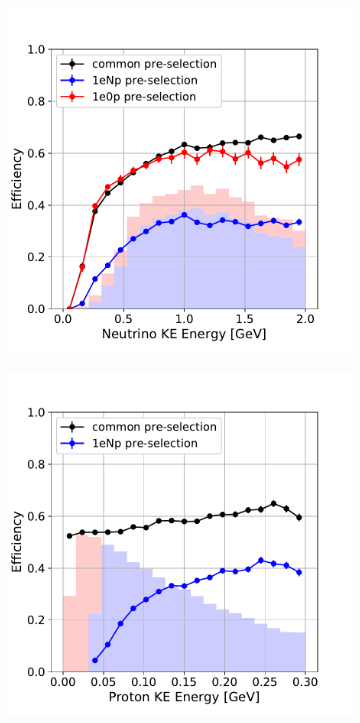 \documentclass[a4paper]{article}
\begin{document}
\begin{figure}[H] 
\begin{center}
    \begin{subfigure}[b]{0.3\textwidth}
    \centering
    \includegraphics[width=1.00\textwidth]{nueselection/nu_RUN1.pdf}
    \caption{\label{fig:nue:presel:eff:nu} }
    \end{subfigure}
    \begin{subfigure}[b]{0.3\textwidth}
    \centering
    \includegraphics[width=1.00\textwidth]{nueselection/proton_RUN1.pdf}

\end{subfigure}
\end{center}
\end{figure}
\end{document}
